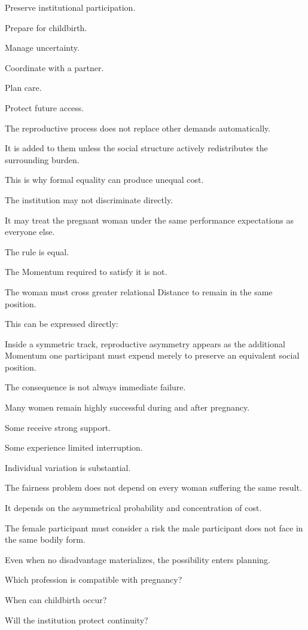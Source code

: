 Preserve institutional participation.

Prepare for childbirth.

Manage uncertainty.

Coordinate with a partner.

Plan care.

Protect future access.

The reproductive process does not replace other demands automatically.

It is added to them unless the social structure actively redistributes the surrounding burden.

This is why formal equality can produce unequal cost.

The institution may not discriminate directly.

It may treat the pregnant woman under the same performance expectations as everyone else.

The rule is equal.

The Momentum required to satisfy it is not.

The woman must cross greater relational Distance to remain in the same position.

This can be expressed directly:

Inside a symmetric track, reproductive asymmetry appears as the additional Momentum one participant must expend merely to preserve an equivalent social position.

The consequence is not always immediate failure.

Many women remain highly successful during and after pregnancy.

Some receive strong support.

Some experience limited interruption.

Individual variation is substantial.

The fairness problem does not depend on every woman suffering the same result.

It depends on the asymmetrical probability and concentration of cost.

The female participant must consider a risk the male participant does not face in the same bodily form.

Even when no disadvantage materializes, the possibility enters planning.

Which profession is compatible with pregnancy?

When can childbirth occur?

Will the institution protect continuity?

